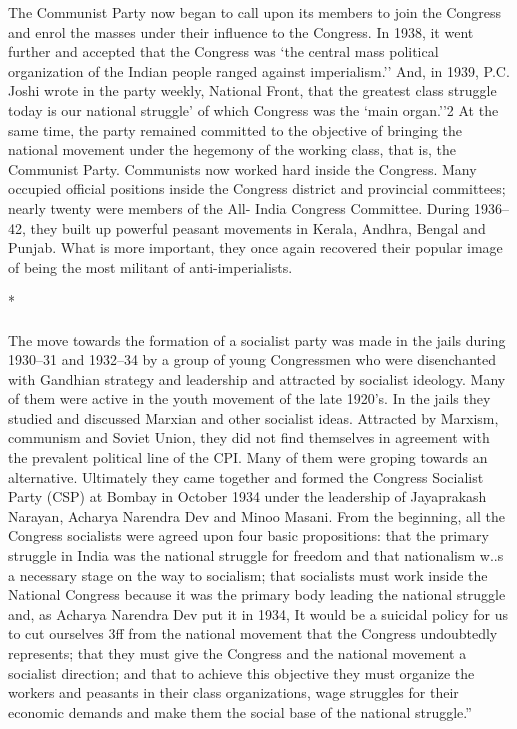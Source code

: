 \begin{multicols}{2}
The Communist Party now began to call upon its members to join the Congress and enrol the masses under their influence to the Congress. In 1938, it went further and accepted that the Congress was `the central mass political organization of the Indian people ranged against imperialism.'' And, in 1939, P.C. Joshi wrote in the party weekly, National Front, that the greatest class struggle today is our national struggle' of which Congress was the `main organ.''2 At the same time, the party remained committed to the objective of bringing the national movement under the hegemony of the working class, that is, the Communist Party. Communists now worked hard inside the Congress. Many occupied official positions inside the Congress district and provincial committees; nearly twenty were members of the All- India Congress Committee. During 1936--42, they built up powerful peasant movements in Kerala, Andhra, Bengal and Punjab. What is more important, they once again recovered their popular image of being the most militant of anti-imperialists.

\begin{center}*\end{center}

\paragraph*{}

The move towards the formation of a socialist party was made in the jails during 1930--31 and 1932--34 by a group of young Congressmen who were disenchanted with Gandhian strategy and leadership and attracted by socialist ideology. Many of them were active in the youth movement of the late 1920's. In the jails they studied and discussed Marxian and other socialist ideas. Attracted by Marxism, communism and Soviet Union, they did not find themselves in agreement with the prevalent political line of the CPI. Many of them were groping towards an alternative. Ultimately they came together and formed the Congress Socialist Party (CSP) at Bombay in October 1934 under the leadership of Jayaprakash Narayan, Acharya Narendra Dev and Minoo Masani. From the beginning, all the Congress socialists were agreed upon four basic propositions: that the primary struggle in India was the national struggle for freedom and that nationalism w..s a necessary stage on the way to socialism; that socialists must work inside the National Congress because it was the primary body leading the national struggle and, as Acharya Narendra Dev put it in 1934, It would be a suicidal policy for us to cut ourselves 3ff from the national movement that the Congress undoubtedly represents; that they must give the Congress and the national movement a socialist direction; and that to achieve this objective they must organize the workers and peasants in their class organizations, wage struggles for their economic demands and make them the social base of the national struggle.'' 


\end{multicols}
